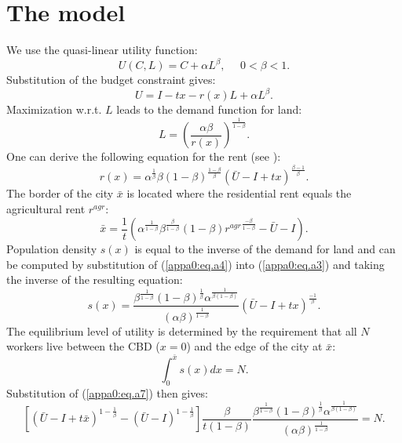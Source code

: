 \documentclass[a4paper,authoryear,review]{elsarticle}  	%
\begin{document}
\section[Appendix A]{The model}\label{appa0}
	We use the quasi-linear utility function:
	\begin{equation}\label{appa0:eq.a1}
		U(C,L) = C + \alpha L^\beta, \quad	\,\, 0<\beta<1 	.
	\end{equation} 
	Substitution of the budget constraint gives:
	\begin{equation}\label{appa0:eq.a2}
		U = I - tx - r(x)L + \alpha L^\beta.
	\end{equation} 
	Maximization w.r.t. $L$ leads to the demand function for land:
	\begin{equation}\label{appa0:eq.a3}
		L = (\frac{\alpha\beta}{r(x)})^{\frac{1}{1-\beta}}.
	\end{equation} 
	One can derive the following equation for the rent (see \citet[p.29]{Glaeser2008b}):
	\begin{equation}\label{appa0:eq.a4}
		r(x) = \alpha^{\frac{1}{\beta}}\beta(1-\beta)^{\frac{1-\beta}{\beta}}(\bar{U}-I+tx)^{\frac{\beta-1}{\beta}}.
	\end{equation} 
	The border of the city $\bar{x}$ is located where the residential rent equals the agricultural rent $r^{agr}$:
	\begin{equation}\label{appa0:eq.a5}
		\bar{x} = \frac{1}{t}(\alpha^{\frac{1}{1-\beta}}\beta^{\frac{\beta}{1-\beta}}(1-\beta){r^{agr}}^{\frac{-\beta}{1-\beta}} - \bar{U} - I).
	\end{equation} 
	Population density $s(x)$ is equal to the inverse of the demand for land and can be computed by substitution of (\ref{appa0:eq.a4}) into (\ref{appa0:eq.a3}) and taking the inverse of the resulting equation:
	\begin{equation}\label{appa0:eq.a6}
		s(x) = \frac{\beta^{\frac{1}{1-\beta}}(1-\beta)^{\frac{1}{\beta}}\alpha^{\frac{1}{\beta(1-\beta)}}}{(\alpha\beta)^{\frac{1}{1-\beta}}}(\bar{U}-I+tx)^{\frac{-1}{\beta}}.
	\end{equation} 
	The equilibrium level of utility is determined by the requirement that all $N$ workers live between the CBD ($x=0$) and the edge of the city at $\bar{x}$:
	\begin{equation}\label{appa0:eq.a7}
		\int_{0}^{\bar{x}}{s(x)}dx = N.
	\end{equation}
	Substitution of (\ref{appa0:eq.a7}) then gives:
	\begin{equation}\label{appa0:eq.a8}
		[(\bar{U}-I+t\bar{x})^{1-\frac{1}{\beta}} - (\bar{U}-I)^{1-\frac{1}{\beta}}]\frac{\beta}{t(1-\beta)}\frac{\beta^{\frac{1}{1-\beta}}(1-\beta)^{\frac{1}{\beta}}\alpha^{\frac{1}{\beta(1-\beta)}}}{(\alpha\beta)^{\frac{1}{1-\beta}}} = N.
	\end{equation}
\end{document}
